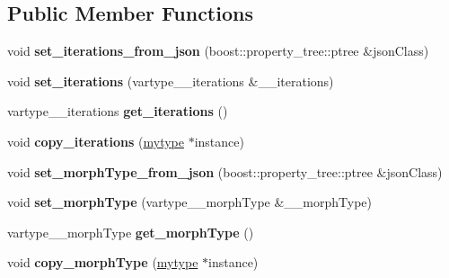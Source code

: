 \subsection*{Public Member Functions}
\begin{DoxyCompactItemize}
\item 
\mbox{\label{classfilter_1_1algos_1_1_dilate_acaf2aae04ee7e94bfd85f934efcc434b}} 
void {\bfseries set\+\_\+iterations\+\_\+from\+\_\+json} (boost\+::property\+\_\+tree\+::ptree \&json\+Class)
\item 
\mbox{\label{classfilter_1_1algos_1_1_dilate_af91a78e1f1318aa33613ff1a7982dc91}} 
void {\bfseries set\+\_\+iterations} (vartype\+\_\+\+\_\+iterations \&\+\_\+\+\_\+iterations)
\item 
\mbox{\label{classfilter_1_1algos_1_1_dilate_ad35efc44f44e92504bd19cd6bfb09493}} 
vartype\+\_\+\+\_\+iterations {\bfseries get\+\_\+iterations} ()
\item 
\mbox{\label{classfilter_1_1algos_1_1_dilate_ad2a9c72c42ae8562466e4d2c43fe2d25}} 
void {\bfseries copy\+\_\+iterations} (\hyperlink{classfilter_1_1algos_1_1_dilate}{mytype} $\ast$instance)
\item 
\mbox{\label{classfilter_1_1algos_1_1_dilate_a7f22d5d9a9e9588c5d64f581646d8007}} 
void {\bfseries set\+\_\+morph\+Type\+\_\+from\+\_\+json} (boost\+::property\+\_\+tree\+::ptree \&json\+Class)
\item 
\mbox{\label{classfilter_1_1algos_1_1_dilate_a341a79c5a7c8d6a076d649144dd26a68}} 
void {\bfseries set\+\_\+morph\+Type} (vartype\+\_\+\+\_\+morph\+Type \&\+\_\+\+\_\+morph\+Type)
\item 
\mbox{\label{classfilter_1_1algos_1_1_dilate_a0eba06ba1158da3b9842dbab788da270}} 
vartype\+\_\+\+\_\+morph\+Type {\bfseries get\+\_\+morph\+Type} ()
\item 
\mbox{\label{classfilter_1_1algos_1_1_dilate_ad5ad3caafe560330bb33d4817095ca04}} 
void {\bfseries copy\+\_\+morph\+Type} (\hyperlink{classfilter_1_1algos_1_1_dilate}{mytype} $\ast$instance)

\end{DoxyCompactItemize}
